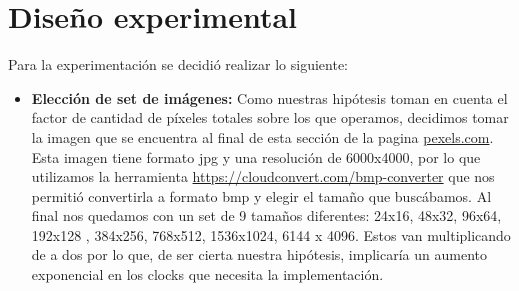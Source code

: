 \documentclass[a4paper]{article}
\begin{document}
\section{Diseño experimental}
Para la experimentación se decidió realizar lo siguiente:

\begin{itemize}
    \item \textbf{Elección de set de imágenes:} Como nuestras hipótesis toman en cuenta el factor de cantidad de píxeles totales sobre los que operamos, decidimos tomar la imagen que se encuentra al final de esta sección de la pagina
     \href{https://www.pexels.com/es-es/foto/reflexion-de-la-montana-en-el-lago-braies-1525041/}{pexels.com}.\\
     Esta imagen tiene formato jpg y una resolución de 6000x4000, por lo que utilizamos la herramienta  \href{https://cloudconvert.com/bmp-converter}{https://cloudconvert.com/bmp-converter} que nos permitió convertirla a formato bmp y elegir el tamaño que buscábamos. Al final nos quedamos con un set de 9 tamaños diferentes: 24x16, 48x32, 96x64, 192x128 , 384x256, 768x512, 1536x1024, 6144 x 4096. Estos van multiplicando de a dos por lo que, de ser cierta nuestra hipótesis, implicaría un aumento exponencial en los clocks que necesita la implementación.


\end{itemize}
\end{document}
